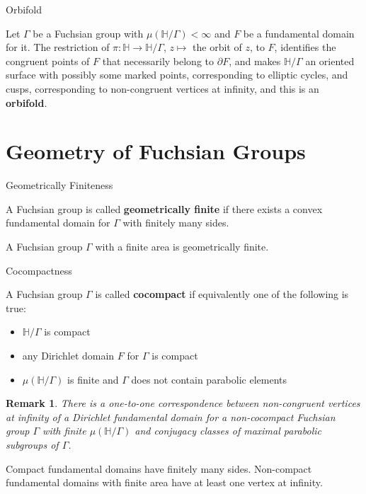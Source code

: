 \documentclass[
	american,
	sections numbered,
	usenames,
	xcolor=dvipsnames,
	aspectratio=169,
]{beamer}
\newcommand{\vocab}[1]{\textbf{\color{blue}\sffamily #1}}
\renewcommand{\H}{\mathbb{H}}
\theoremstyle{plain}%
\newtheorem{remark}[theorem]{Remark}
\begin{document}
\begin{frame}{Orbifold}

    Let $\Gamma$ be a Fuchsian group with $\mu(\H/\Gamma)<\infty$ and $F$ be a fundamental domain for it. The restriction of $\pi:\H\rightarrow\H/\Gamma$, $z\mapsto$ the orbit of $z$, to $F$, identifies the congruent points of $F$ that necessarily belong to $\partial F$, and makes $\H/\Gamma$ an oriented surface with possibly some marked points, corresponding to elliptic cycles, and cusps, corresponding to non-congruent vertices at infinity, and this is an \vocab{orbifold}.
    
\end{frame}

\section{Geometry of Fuchsian Groups}

\begin{frame}{Geometrically Finiteness}

	A Fuchsian group is called \vocab{geometrically finite} if there exists a convex fundamental domain for $\Gamma$ with finitely many sides.


    \begin{theorem}
    A Fuchsian group $\Gamma$ with a finite area is geometrically finite.
    \end{theorem}

\end{frame}

\begin{frame}{Cocompactness}

	A Fuchsian group $\Gamma$ is called \vocab{cocompact} if equivalently one of the following is true:
    \begin{itemize}
        \item $\H/\Gamma$ is compact
        \item any Dirichlet domain $F$ for $\Gamma$ is compact
        \item $\mu(\H/\Gamma)$ is finite and $\Gamma$ does not contain parabolic elements
    \end{itemize}

    \begin{remark}
    There is a one-to-one correspondence between non-congruent vertices at infinity of a Dirichlet fundamental domain for a non-cocompact Fuchsian group $\Gamma$ with finite $\mu(\H/\Gamma)$ and conjugacy classes of maximal parabolic subgroups of $\Gamma$.
    \end{remark}

    Compact fundamental domains have finitely many sides. Non-compact fundamental domains with finite area have at least one vertex at infinity.

\end{frame}
\end{document}
